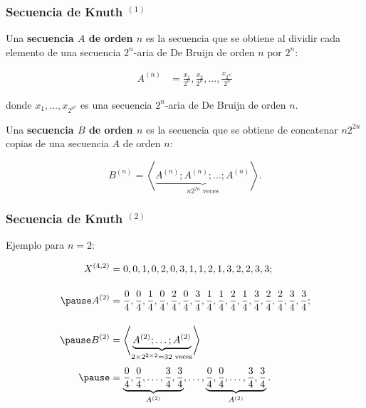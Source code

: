 \documentclass[t, 10pt, mathserif]{beamer}
\begin{document}

\begin{frame}
  \frametitle{Secuencia de Knuth {$^{(1)}$}}
  \pause

  \vspace{-0.5cm}
  \begin{definition}
    \medskip
    Una \textbf{secuencia $A$ de orden $n$} es la secuencia que se obtiene al dividir cada elemento de una secuencia $2^n$-aria de De Bruijn de orden $n$ por $2^n$:
    \pause

    \begin{equation*}
      \begin{aligned}
        A^{(n)} & = \frac{x_1}{2^n}, \frac{x_2}{2^n}, \dots, \frac{x_{2^{n^2}}}{2^n}
      \end{aligned}
    \end{equation*}

    \medskip
    donde $x_1, \dots, x_{2^{n^2}}$ es una secuencia $2^n$-aria de De Bruijn de orden $n$.
  \end{definition}
  \pause

  \begin{definition}
    \medskip
    Una \textbf{secuencia $B$ de orden $n$} es la secuencia que se obtiene de concatenar $n 2^{2 n}$ copias de una secuencia $A$ de orden $n$:
    \pause

    \begin{equation*}
      B^{(n)} = \left< \underbrace{A^{(n)} ; A^{(n)} ; \dots ; A^{(n)}}_{n 2^{2 n} \text{ veces}} \right> \text{.}
    \end{equation*}
  \end{definition}
\end{frame}



\begin{frame}
  \frametitle{Secuencia de Knuth {$^{(2)}$}}

  Ejemplo para $n = 2$:
  \pause

  \begin{equation*}
    \begin{aligned}
      X^{(4, 2)} & = 0, 0, 1, 0, 2, 0, 3, 1, 1, 2, 1, 3, 2, 2, 3, 3 \text{;} \\[0.4cm] \pause
      A^{(2)}    & = \frac{0}{4}, \frac{0}{4}, \frac{1}{4}, \frac{0}{4}, \frac{2}{4}, \frac{0}{4}, \frac{3}{4}, \frac{1}{4}, \frac{1}{4}, \frac{2}{4}, \frac{1}{4}, \frac{3}{4}, \frac{2}{4}, \frac{2}{4}, \frac{3}{4}, \frac{3}{4} \text{;} \\[0.4cm] \pause
      B^{(2)}   & = \left< \underbrace{A^{(2)} ; \dots ; A^{(2)}}_{2 \times 2^{2 \times 2} = 32 \text{ veces}} \right> \\[0.1cm] \pause
                & = \underbrace{\frac{0}{4}, \frac{0}{4}, \dots, \frac{3}{4}, \frac{3}{4}}_{A^{(2)}}, \dots, \underbrace{\frac{0}{4}, \frac{0}{4}, \dots, \frac{3}{4}, \frac{3}{4}}_{A^{(2)}} \text{.}
    \end{aligned}
  \end{equation*}
\end{frame}
\end{document}
